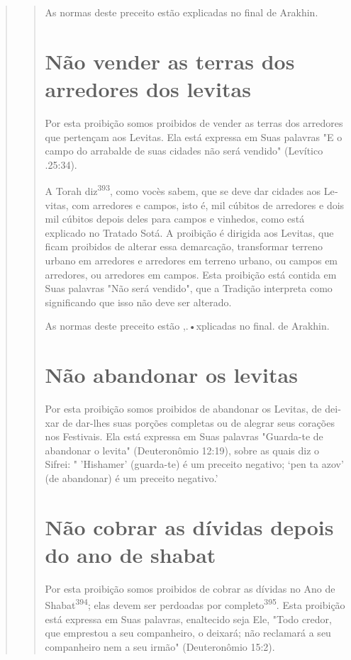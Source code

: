 \begin{quote}
\begin{quote}
As normas deste preceito estão explicadas no final de Arakhin.

\section{Não vender as terras dos arredores dos levitas}

Por esta proibição somos proibidos de vender as terras dos arredo­res
que pertençam aos Levitas. Ela está expressa em Suas palavras "E o campo
do arrabalde de suas cidades não será vendido" (Levítico .25:34).

A Torah diz\textsuperscript{393}, como vocès sabem, que se deve dar
cidades aos Le­vitas, com arredores e campos, isto é, mil cúbitos de
arredores e dois mil cúbi­tos depois deles para campos e vinhedos, como
está explicado no Tratado So­tá. A proibição é dirigida aos Levitas, que
ficam proibidos de alterar essa de­marcação, transformar terreno urbano
em arredores e arredores em terreno ur­bano, ou campos em arredores, ou
arredores em campos. Esta proibição está contida em Suas palavras "Não
será vendido", que a Tradição interpreta como significando que isso não
deve ser alterado.

As normas deste preceito estão ,.•xplicadas no final. de Arakhin.

\section{Não abandonar os levitas}

Por esta proibição somos proibidos de abandonar os Levitas, de dei­xar
de dar-lhes suas porções completas ou de alegrar seus corações nos
Festi­vais. Ela está expressa em Suas palavras "Guarda-te de abandonar o
levita" (Deu­teronômio 12:19), sobre as quais diz o Sifrei: " 'Hishamer'
(guarda-te) é um pre­ceito negativo; `pen ta azov' (de abandonar) é um
preceito negativo.'

\section{Não cobrar as dívidas depois do ano de shabat}

Por esta proibição somos proibidos de cobrar as dívidas no Ano de
Shabat\textsuperscript{394}; elas devem ser perdoadas por
completo\textsuperscript{395}. Esta proibição está ex­pressa em Suas
palavras, enaltecido seja Ele, "Todo credor, que emprestou a seu
companheiro, o deixará; não reclamará a seu companheiro nem a seu
ir­mão" (Deuteronômio 15:2).


\end{quote}
\end{quote}
